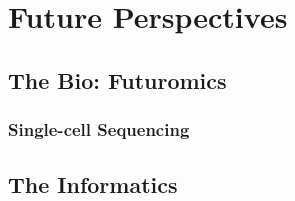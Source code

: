 \section{Future Perspectives}
\subsection{The Bio: Futuromics}

\subsubsection{Single-cell Sequencing}

\subsection{The Informatics}
\begin{comment}
- bigger better more RAM/CPU to keep up with the ever increasing data sizes, cloudification
- make it usable - the biologists have the knowledge for interpretation, software should be
  usable by them, not just bioinformaticians, Galaxy/docker/conda etc helps with this
- make it maintainable as developers by adhering to coding best-practices and through the
  use of continuous integration strategies>
- training is vital, the more complex these data and methods get, the harder it will be to
  draw accurate conclusions>
- quantum computing? blockchain? the future or just hype?
\end{comment}

